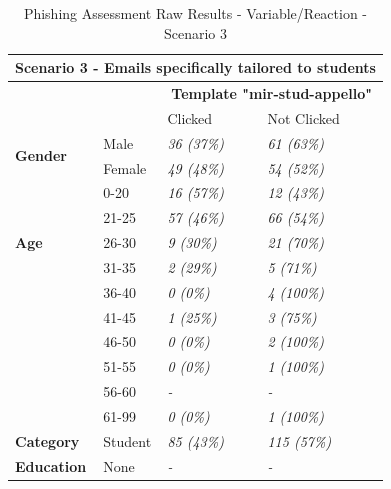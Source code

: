 \documentclass[a4paper]{article}
\begin{document}
\begingroup
\renewcommand{\arraystretch}{1.25}
\begin{table}[ht]
\begin{center}
    \begin{tabular}{ | m{7em} | m{9em} | m{9em} | m{9em} | }
    \hline
    \multicolumn{4}{|c|}{\textbf{Scenario 3 - Emails specifically tailored to students}} \\ \hline
    & & \multicolumn{2}{|c|}{\textbf{Template "mir-stud-appello"}} \\ \hline
    & & Clicked & Not Clicked \\ \hline
    
    \multirow{2}{*}{\textbf{Gender}} 
    & Male & \textit{36 (37\%)} & \textit{61 (63\%)} \\ \cline{2-4}
    & Female & \textit{49 (48\%)} & \textit{54 (52\%)} \\ \hline
    
    \multirow{5}{*}{\textbf{Age}} 
    & 0-20 & \textit{16 (57\%)} & \textit{12 (43\%)} \\ \cline{2-4}
    & 21-25 & \textit{57 (46\%)} & \textit{66 (54\%)} \\ \cline{2-4}
    & 26-30 & \textit{9 (30\%)} & \textit{21 (70\%)} \\ \cline{2-4}
    & 31-35 & \textit{2 (29\%)} & \textit{5 (71\%)} \\ \cline{2-4}
    & 36-40 & \textit{0 (0\%)} & \textit{4 (100\%)} \\ \cline{2-4}
    & 41-45 & \textit{1 (25\%)} & \textit{3 (75\%)} \\ \cline{2-4}
    & 46-50 & \textit{0 (0\%)} & \textit{2 (100\%)} \\ \cline{2-4}
    & 51-55 & \textit{0 (0\%)} & \textit{1 (100\%)} \\ \cline{2-4}
    & 56-60 & \textit{-} & \textit{-} \\ \cline{2-4}
    & 61-99 & \textit{0 (0\%)} & \textit{1 (100\%)} \\ \hline
    
    \multirow{1}{*}{\textbf{Category}}
    & Student & \textit{85 (43\%)} & \textit{115 (57\%)} \\ \hline
    
    \multirow{1}{*}{\textbf{Education}}
    & None & \textit{-} & \textit{-} \\ \hline
    \end{tabular}
\end{center}
\caption{Phishing Assessment Raw Results - Variable/Reaction - Scenario 3}
\label{t-varreact3}
\end{table}
\endgroup
\end{document}
